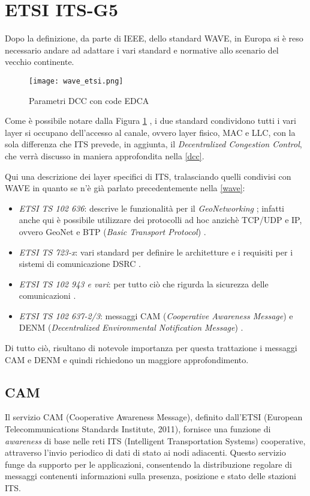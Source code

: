\section{ETSI ITS-G5}
Dopo la definizione, da parte di IEEE, dello standard WAVE, in Europa si è reso necessario andare ad adattare i vari standard e normative allo scenario del vecchio continente.

\begin{figure}[h!]
    \centering
    \texttt{[image: wave\_etsi.png]}
    \caption{Parametri DCC con code EDCA}
    \label{fig:wave_etsi}
\end{figure}

Come è possibile notare dalla Figura \ref{fig:wave_etsi} \cite{etsi_security_standard}, i due standard condividono tutti i vari layer si occupano dell'accesso al canale, ovvero layer fisico, MAC e LLC, con la sola differenza che ITS prevede, in aggiunta, il \textit{Decentralized Congestion Control}, che verrà discusso in maniera approfondita nella \autoref{dcc}.

Qui una descrizione dei layer specifici di ITS, tralasciando quelli condivisi con WAVE in quanto se n'è già parlato precedentemente nella \autoref{wave}:

\begin{itemize}
    \item \textit{ETSI TS 102 636}: descrive le funzionalità per il \textit{GeoNetworking} \cite{etsi2013intelligent}; infatti anche qui è possibile utilizzare dei protocolli ad hoc anzichè TCP/UDP e IP, ovvero GeoNet e BTP (\textit{Basic Transport Protocol}) \cite{vogt2024comprehensive}.
    \item \textit{ETSI TS 723-x}: vari standard per definire le architetture e i requisiti per i sistemi di comunicazione DSRC \cite{etsi2012intelligent}.
    \item \textit{ETSI TS 102 943 e vari}: per tutto ciò che rigurda la sicurezza delle comunicazioni \cite{etsi2012intelligent_security}.
    \item \textit{ETSI TS 102 637-2/3}: messaggi CAM (\textit{Cooperative Awareness Message}) \cite{etsi2010102} e DENM (\textit{Decentralized Environmental Notification Message}) \cite{etsi2010etsi}.
\end{itemize}

Di tutto ciò, risultano di notevole importanza per questa trattazione i messaggi CAM e DENM e quindi richiedono un maggiore approfondimento.

\subsection[CAM]{CAM}
Il servizio CAM (Cooperative Awareness Message), definito dall'ETSI (European Telecommunications Standards Institute, 2011), fornisce una funzione di \textit{awareness} di base nelle reti ITS (Intelligent Transportation Systems) cooperative, attraverso l'invio periodico di dati di stato ai nodi adiacenti. Questo servizio funge da supporto per le applicazioni, consentendo la distribuzione regolare di messaggi contenenti informazioni sulla presenza, posizione e stato delle stazioni ITS.

